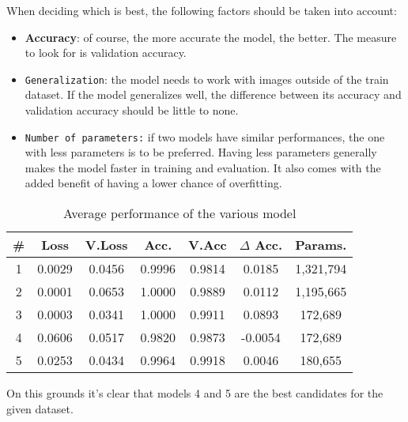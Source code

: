 When deciding which is best, the following factors should be taken into account:
\begin{itemize}
\item \textbf{Accuracy}: of course, the more accurate the model, the better. The measure to look for is validation accuracy.
\item \texttt{Generalization}: the model needs to work with images outside of the train dataset. If the model generalizes well, the difference between its accuracy and validation accuracy should be little to none.
\item \texttt{Number of parameters:} if two models have similar performances, the one with less parameters is to be preferred. Having less parameters generally makes the model faster in training and evaluation. It also comes with the added benefit of having a lower chance of overfitting.
\end{itemize}

\begin{table}[H]
	\centering
	\begin{tabular}{ccc cccc}
	\textbf{\#} & \textbf{Loss} & \textbf{V.Loss} & \textbf{Acc.} & \textbf{V.Acc} & \textbf{$\Delta$ Acc.} & \textbf{Params.}\\ \hline
	1 & 0.0029 & 0.0456 & 0.9996 & 0.9814 & 0.0185 & 1,321,794\\ 
	2 & 0.0001 & 0.0653 & 1.0000	& 0.9889 & 0.0112 & 1,195,665\\
	3 & 0.0003 & 0.0341 & 1.0000 & 0.9911 & 0.0893 & 172,689\\
	4 & 0.0606 & 0.0517 & 0.9820 & 0.9873 & -0.0054 & 172,689\\
	5 & 0.0253 & 0.0434 & 0.9964 & 0.9918 & 0.0046 & 180,655\\
	\end{tabular}
	\caption{Average performance of the various model}
\end{table}

On this grounds it's clear that models 4 and 5 are the best candidates for the given dataset.